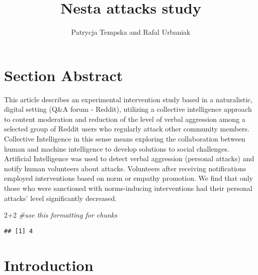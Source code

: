 \documentclass[
  10pt,
  dvipsnames,enabledeprecatedfontcommands]{scrartcl}
\title{Nesta attacks study}
\author{Patrycja Tempska and Rafal Urbaniak}
\date{}
\newenvironment{Shaded}{\begin{snugshade}}{\end{snugshade}}
\newcommand{\CommentTok}[1]{\textcolor[rgb]{0.56,0.35,0.01}{\textit{#1}}}
\newcommand{\DecValTok}[1]{\textcolor[rgb]{0.00,0.00,0.81}{#1}}
\newcommand{\SpecialCharTok}[1]{\textcolor[rgb]{0.00,0.00,0.00}{#1}}
\begin{document}
\maketitle

\tableofcontents

\hypertarget{section-abstract}{%
\section{Section Abstract}\label{section-abstract}}

This article describes an experimental intervention study based in a
naturalistic, digital setting (Q\&A forum - Reddit), utilizing a
collective intelligence approach to content moderation and reduction of
the level of verbal aggression among a selected group of Reddit users
who regularly attack other community members. Collective Intelligence in
this sense means exploring the collaboration between human and machine
intelligence to develop solutions to social challenges. Artificial
Intelligence was used to detect verbal aggression (personal attacks) and
notify human volunteers about attacks. Volunteers after receiving
notifications employed interventions based on norm or empathy promotion.
We find that only those who were sanctioned with norms-inducing
interventions had their personal attacks' level significantly decreased.

\vspace{1mm}
\footnotesize

\begin{Shaded}
\begin{Highlighting}[]
\DecValTok{2}\SpecialCharTok{+}\DecValTok{2} \CommentTok{\#use this formatting for chunks}
\end{Highlighting}
\end{Shaded}

\begin{verbatim}
## [1] 4
\end{verbatim}

\normalsize

\hypertarget{introduction}{%
\section{Introduction}\label{introduction}}
\end{document}
